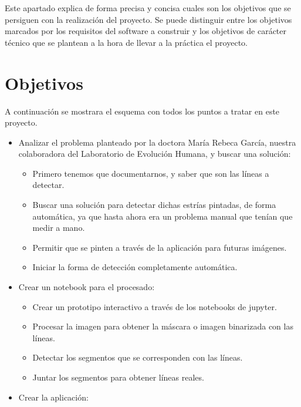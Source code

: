 
Este apartado explica de forma precisa y concisa cuales son los objetivos que se persiguen con la realización del proyecto. Se puede distinguir entre los objetivos marcados por los requisitos del software a construir y los objetivos de carácter técnico que se plantean a la hora de llevar a la práctica el proyecto.

\section{Objetivos}
A continuación se mostrara el esquema con todos los puntos a tratar en este proyecto.
\begin{itemize}
\item Analizar el problema planteado por la doctora María Rebeca García, nuestra colaboradora del Laboratorio de Evolución Humana, y buscar una solución:
	\begin{itemize}
		\item Primero tenemos que documentarnos, y saber que son las líneas a detectar.
		\item Buscar una solución para detectar dichas estrías pintadas, de forma automática, ya que hasta ahora era un problema manual que tenían que medir a mano.
		\item Permitir que se pinten a través de la aplicación para futuras imágenes.
		\item Iniciar la forma de detección completamente automática.
	\end{itemize}
\item Crear un notebook para el procesado:
	\begin{itemize}
		\item Crear un prototipo interactivo a través de los notebooks de jupyter.
		\item Procesar la imagen para obtener la máscara o imagen binarizada con las líneas.
		\item Detectar los segmentos que se corresponden con las líneas.
		\item Juntar los segmentos para obtener líneas reales.
	\end{itemize}
\item Crear la aplicación:
\end{itemize}

